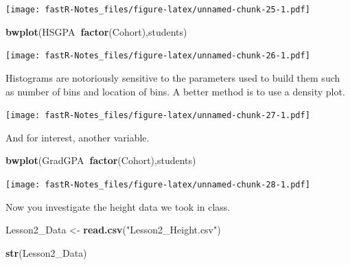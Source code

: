 \documentclass[]{book}
\newenvironment{Shaded}{\begin{snugshade}}{\end{snugshade}}
\newcommand{\KeywordTok}[1]{\textcolor[rgb]{0.13,0.29,0.53}{\textbf{#1}}}
\newcommand{\DataTypeTok}[1]{\textcolor[rgb]{0.13,0.29,0.53}{#1}}
\newcommand{\StringTok}[1]{\textcolor[rgb]{0.31,0.60,0.02}{#1}}
\newcommand{\OperatorTok}[1]{\textcolor[rgb]{0.81,0.36,0.00}{\textbf{#1}}}
\newcommand{\NormalTok}[1]{#1}
\theoremstyle{definition}
\theoremstyle{definition}
\theoremstyle{definition}
\theoremstyle{remark}
\begin{document}
\texttt{[image: fastR-Notes\_files/figure-latex/unnamed-chunk-25-1.pdf]}

\begin{Shaded}
\begin{Highlighting}[]
\KeywordTok{bwplot}\NormalTok{(HSGPA}\OperatorTok{~}\KeywordTok{factor}\NormalTok{(Cohort),students)}
\end{Highlighting}
\end{Shaded}

\texttt{[image: fastR-Notes\_files/figure-latex/unnamed-chunk-26-1.pdf]}

Histograms are notoriously sensitive to the parameters used to build
them such as number of bins and location of bins. A better method is to
use a density plot.

\begin{Shaded}
\end{Shaded}

\texttt{[image: fastR-Notes\_files/figure-latex/unnamed-chunk-27-1.pdf]}

And for interest, another variable.

\begin{Shaded}
\begin{Highlighting}[]
\KeywordTok{bwplot}\NormalTok{(GradGPA}\OperatorTok{~}\KeywordTok{factor}\NormalTok{(Cohort),students)}
\end{Highlighting}
\end{Shaded}

\texttt{[image: fastR-Notes\_files/figure-latex/unnamed-chunk-28-1.pdf]}

Now you investigate the height data we took in class.

\begin{Shaded}
\begin{Highlighting}[]
\NormalTok{Lesson2_Data <-}\StringTok{ }\KeywordTok{read.csv}\NormalTok{(}\StringTok{"Lesson2_Height.csv"}\NormalTok{)}
\end{Highlighting}
\end{Shaded}

\begin{Shaded}
\begin{Highlighting}[]
\KeywordTok{str}\NormalTok{(Lesson2_Data)}
\end{Highlighting}
\end{Shaded}
\end{document}
